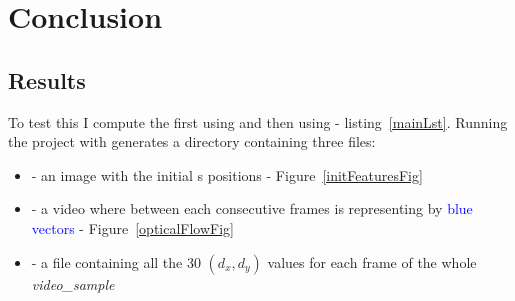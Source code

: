 
\chapter{Conclusion} %

\label{Conclusion} %




\section{Results}

To test this \api{} I compute the \flow{} first using  and then using  - listing~\ref{mainLst}. Running the project with  generates a directory containing three files:
\begin{itemize}
	\item {} - an image with the initial \feat{}s positions - Figure~\ref{initFeaturesFig}
	\item {} - a video where \flow{} between each consecutive frames is representing by \textcolor{blue}{blue vectors} - Figure~\ref{opticalFlowFig}
	\item {} - a  file containing all the 30 $(d_{x},d_{y})$ values for each frame of the whole \emph{video\_sample}
\end{itemize}

